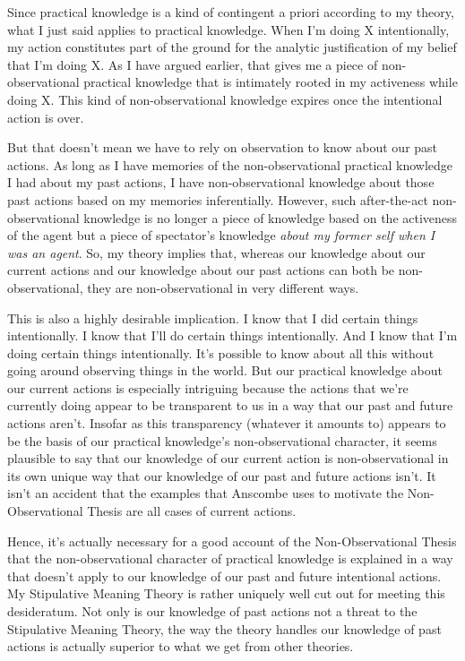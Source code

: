 \documentclass[a4paper,12pt]{article}
\begin{document}
Since practical knowledge is a kind of contingent a priori according to my theory, what I just said applies to practical knowledge. When I'm doing X intentionally, my action constitutes part of the ground for the analytic justification of my belief that I'm doing X. As I have argued earlier, that gives me a piece of non-observational practical knowledge that is intimately rooted in my activeness while doing X. This kind of non-observational knowledge expires once the intentional action is over.

But that doesn't mean we have to rely on observation to know about our past actions. As long as I have memories of the non-observational practical knowledge I had about my past actions, I have non-observational knowledge about those past actions based on my memories inferentially. However, such after-the-act non-observational knowledge is no longer a piece of knowledge based on the activeness of the agent but a piece of spectator's knowledge \emph{about my former self when I was an agent}. So, my theory implies that, whereas our knowledge about our current actions and our knowledge about our past actions can both be non-observational, they are non-observational in very different ways.

This is also a highly desirable implication. I know that I did certain things intentionally. I know that I'll do certain things intentionally. And I know that I'm doing certain things intentionally. It's possible to know about all this without going around observing things in the world. But our practical knowledge about our current actions is especially intriguing because the actions that we're currently doing appear to be transparent to us in a way that our past and future actions aren't. Insofar as this transparency (whatever it amounts to) appears to be the basis of our practical knowledge's non-observational character, it seems plausible to say that our knowledge of our current action is non-observational in its own unique way that our knowledge of our past and future actions isn't. It isn't an accident that the examples that Anscombe uses to motivate the Non-Observational Thesis are all cases of current actions.

Hence, it's actually necessary for a good account of the Non-Observational Thesis that the non-observational character of practical knowledge is explained in a way that doesn't apply to our knowledge of our past and future intentional actions. My Stipulative Meaning Theory is rather uniquely well cut out for meeting this desideratum. Not only is our knowledge of past actions not a threat to the Stipulative Meaning Theory, the way the theory handles our knowledge of past actions is actually superior to what we get from other theories.

\nocite{*}


\end{document}
